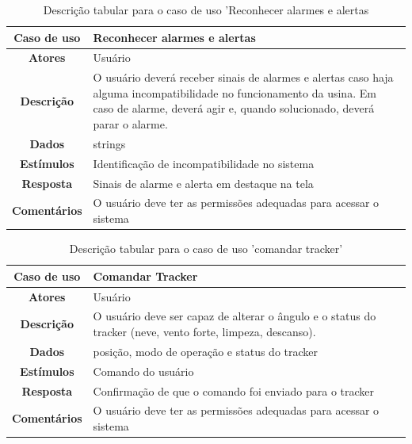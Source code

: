 \documentclass[a4paper,12pt]{article}
\begin{document}
\begin{table}[htbp]
\begin{center}
\begin{tabular}{|c|p{12cm}|}
\hline
\cellcolor{gray} \textbf{Caso de uso} & Reconhecer alarmes e alertas\\
\hline
\cellcolor{gray} \textbf{Atores}  & Usuário \\
\hline
\cellcolor{gray} \textbf{Descrição} &  O usuário deverá receber sinais de alarmes e alertas caso haja alguma incompatibilidade no funcionamento da usina. Em caso de alarme, deverá agir e, quando solucionado, deverá parar o alarme.    \\
\hline
\cellcolor{gray} \textbf{Dados} &  strings \\ 
\hline
\cellcolor{gray} \textbf{Estímulos} & Identificação de  incompatibilidade no sistema \\
\hline
\cellcolor{gray} \textbf{Resposta} & Sinais de alarme e alerta em destaque na tela \\
\hline
\cellcolor{gray} \textbf{Comentários} & O usuário deve ter as permissões adequadas para acessar o sistema \\
\hline
\end{tabular}
\caption{Descrição tabular para o caso de uso 'Reconhecer alarmes e alertas}
\label{tab:reconhecer_a_a}
\end{center}
\end{table}



\begin{table}[htbp]
\begin{center}
\begin{tabular}{|c|p{12cm}|}
\hline
\cellcolor{gray} \textbf{Caso de uso} & Comandar Tracker\\
\hline
\cellcolor{gray} \textbf{Atores}  & Usuário \\
\hline
\cellcolor{gray} \textbf{Descrição} &  O usuário deve ser capaz de alterar o ângulo e o status do tracker (neve, vento forte, limpeza, descanso).   \\
\hline
\cellcolor{gray} \textbf{Dados} & posição, modo de operação e status do tracker  \\ 
\hline
\cellcolor{gray} \textbf{Estímulos} & Comando do usuário \\
\hline
\cellcolor{gray} \textbf{Resposta} & Confirmação de que o comando foi enviado para o tracker \\
\hline
\cellcolor{gray} \textbf{Comentários} & O usuário deve ter as permissões adequadas para acessar o sistema \\
\hline
\end{tabular}
\caption{Descrição tabular para o caso de uso 'comandar tracker'}
\label{tab:comandar_T}
\end{center}
\end{table}
\end{document}
